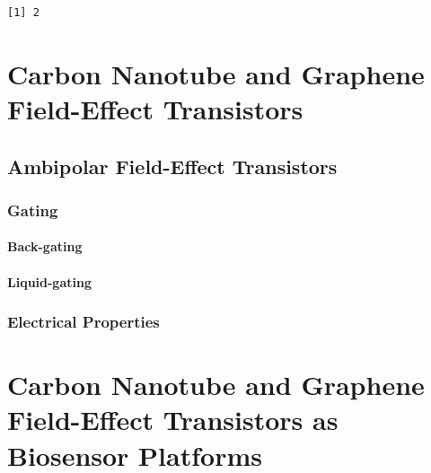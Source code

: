 \documentclass[
  a4paper,
]{scrbook}
\begin{document}
\begin{verbatim}
[1] 2
\end{verbatim}


\hypertarget{carbon-nanotube-and-graphene-field-effect-transistors}{%
\chapter{Carbon Nanotube and Graphene Field-Effect
Transistors}\label{carbon-nanotube-and-graphene-field-effect-transistors}}

\hypertarget{ambipolar-field-effect-transistors}{%
\section{Ambipolar Field-Effect
Transistors}\label{ambipolar-field-effect-transistors}}

\hypertarget{sec-gating}{%
\subsection{Gating}\label{sec-gating}}

\hypertarget{back-gating}{%
\subsubsection*{Back-gating}\label{back-gating}}

\hypertarget{liquid-gating}{%
\subsubsection*{Liquid-gating}\label{liquid-gating}}

\hypertarget{electrical-properties}{%
\subsection{Electrical Properties}\label{electrical-properties}}


\hypertarget{carbon-nanotube-and-graphene-field-effect-transistors-as-biosensor-platforms}{%
\chapter{Carbon Nanotube and Graphene Field-Effect Transistors as
Biosensor
Platforms}\label{carbon-nanotube-and-graphene-field-effect-transistors-as-biosensor-platforms}}
\end{document}
